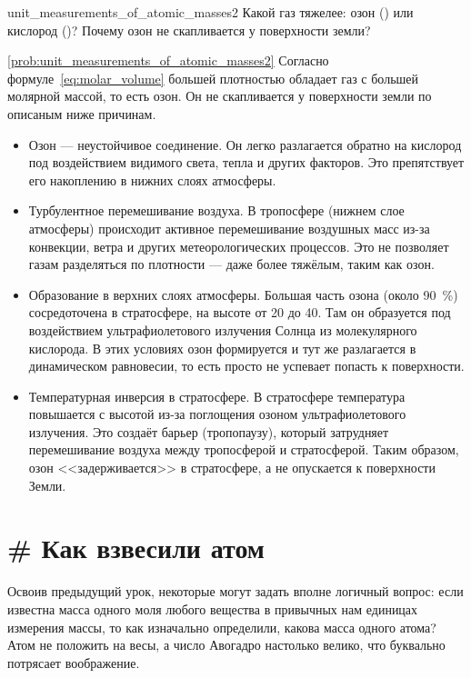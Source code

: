 \begin{problem}{}{unit_measurements_of_atomic_masses2}
    Какой газ тяжелее: озон () или кислород ()?
    Почему озон не скапливается у поверхности земли?
    \begin{sol}{\ref{prob:unit_measurements_of_atomic_masses2}}
        Согласно формуле~\eqref{eq:molar_volume} большей плотностью обладает газ с большей молярной массой, то есть озон. Он не скапливается у поверхности земли по описаным ниже причинам.
        \begin{itemize}
            \item Озон --- неустойчивое соединение. Он легко разлагается обратно на кислород под воздействием видимого света, тепла и других факторов. Это препятствует его накоплению в нижних слоях атмосферы.
            \item Турбулентное перемешивание воздуха. В тропосфере (нижнем слое атмосферы) происходит активное перемешивание воздушных масс из-за конвекции, ветра и других метеорологических процессов. Это не позволяет газам разделяться по плотности --- даже более тяжёлым, таким как озон.
            \item Образование в верхних слоях атмосферы. Большая часть озона (около \qty{90}{\percent}) сосредоточена в стратосфере, на высоте от 20 до \qty{40}{\ruKm}. Там он образуется под воздействием ультрафиолетового излучения Солнца из молекулярного кислорода. В этих условиях озон формируется и тут же разлагается в динамическом равновесии, то есть просто не успевает попасть к поверхности.
            \item Температурная инверсия в стратосфере. В стратосфере температура повышается с высотой из-за поглощения озоном ультрафиолетового излучения. Это создаёт барьер (тропопаузу), который затрудняет перемешивание воздуха между тропосферой и стратосферой. Таким образом, озон <<задерживается>> в стратосфере, а не опускается к поверхности Земли.
        \end{itemize}
    \end{sol}
\end{problem}

\clearpage

\section{\# Как взвесили атом}

Освоив предыдущий урок, некоторые могут задать вполне логичный вопрос: если известна масса одного моля любого вещества в привычных нам единицах измерения массы, то как изначально определили, какова масса одного атома? Атом не положить на весы, а число Авогадро настолько велико, что буквально потрясает воображение.

